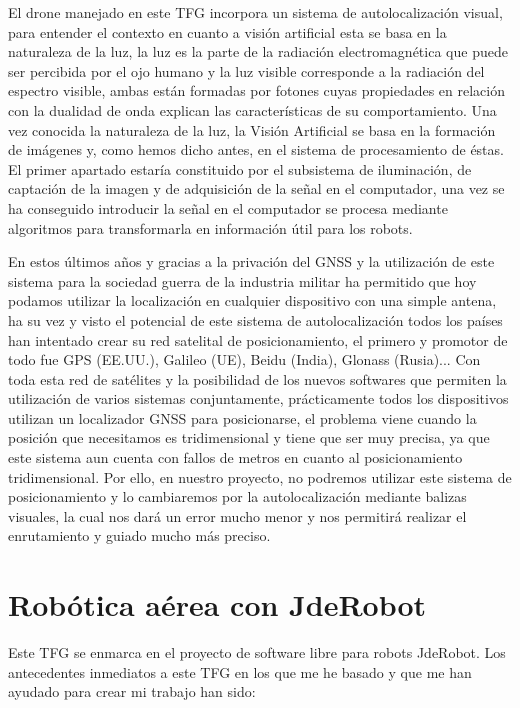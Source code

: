 \hspace{1cm} El drone manejado en este TFG incorpora un sistema de autolocalización visual, para entender el contexto en cuanto a visión artificial esta se basa en la naturaleza de la luz, la luz es la parte de la radiación electromagnética que puede ser percibida por el ojo humano y la luz visible corresponde a la radiación del espectro visible, ambas están formadas por fotones cuyas propiedades en relación con la dualidad de onda explican las características de su comportamiento. Una vez conocida la naturaleza de la luz, la Visión Artificial se basa en la formación de imágenes y, como hemos dicho antes, en el sistema de procesamiento de éstas. El primer apartado estaría constituido  por  el  subsistema  de  iluminación,  de  captación  de  la  imagen  y  de adquisición  de  la  señal  en  el  computador, una vez se ha conseguido introducir la señal en el computador se procesa mediante algoritmos para transformarla en información útil para los robots.

\hspace{1cm} En estos últimos años y gracias a la privación del GNSS y la utilización de este sistema para la sociedad guerra de la industria militar ha permitido que hoy podamos utilizar la localización en cualquier dispositivo con una simple antena, ha su vez y visto el potencial de este sistema de autolocalización todos los países han intentado crear su red satelital de posicionamiento, el primero y promotor de todo fue GPS (EE.UU.), Galileo (UE), Beidu (India), Glonass (Rusia)... Con toda esta red de satélites y la posibilidad de los nuevos softwares que permiten la utilización de varios sistemas conjuntamente, prácticamente todos los dispositivos utilizan un localizador GNSS para posicionarse, el problema viene cuando la posición que necesitamos es tridimensional y tiene que ser muy precisa, ya que este sistema aun cuenta con fallos de metros en cuanto al posicionamiento tridimensional. Por ello, en nuestro proyecto, no podremos utilizar este sistema de posicionamiento y lo cambiaremos por la autolocalización mediante balizas visuales, la cual nos dará un error mucho menor y nos permitirá realizar el enrutamiento y guiado mucho más preciso.
\\

\section{Robótica aérea con JdeRobot}
\hspace{1cm} Este TFG se enmarca en el proyecto de software libre para robots JdeRobot. Los antecedentes inmediatos a este TFG en los que me he basado y que me han ayudado para crear mi trabajo han sido:

